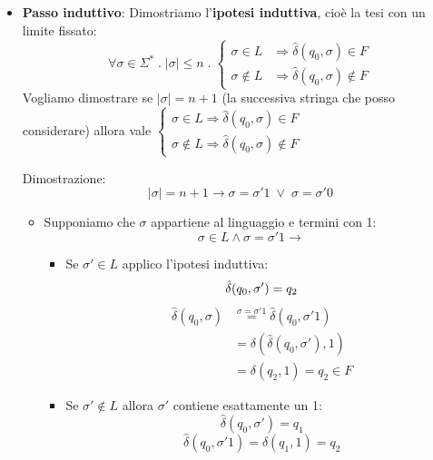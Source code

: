\documentclass[a4paper]{article}
\begin{document}
\begin{example}
\begin{itemize}
    \item \textbf{Passo induttivo}: Dimostriamo l'\textbf{ipotesi induttiva}, cioè
      la tesi con un limite fissato:
      \[
        \forall \sigma \in \Sigma^* \;.\; \left| \sigma  \right| \le n \;.\;
        \begin{cases}
          \sigma \in L &\Rightarrow \hat{\delta}(q_0, \sigma) \in F\\
          \sigma \notin L &\Rightarrow \hat{\delta}(q_0, \sigma) \notin F
        \end{cases}
      \] 
      Vogliamo dimostrare se \( \left| \sigma  \right| = n + 1 \) (la successiva stringa
      che posso considerare) allora vale
      \( 
        \begin{cases}
          \sigma \in L \Rightarrow \hat{\delta}(q_0,\sigma) \in F\\
          \sigma \notin L \Rightarrow \hat{\delta}(q_0,\sigma) \notin F
        \end{cases}
      \) 

      \vspace{1em}
      \noindent
      Dimostrazione:
      \[
        \left| \sigma  \right| = n + 1 \to 
          \sigma = \sigma'1 \; \vee \; \sigma = \sigma'0
      \] 
      \begin{itemize}
        \item Supponiamo che \( \sigma  \) appartiene al linguaggio e termini con 1:
          \[
            \sigma \in L \wedge \sigma  = \sigma'1 \to 
          \] 
          \begin{itemize}
            \item Se \( \sigma' \in L \) applico l'ipotesi induttiva:
              \[
                  \hat{\delta}(q_0, \sigma') = q_2\\
              \] 
              \[
                \begin{aligned}
                  \hat{\delta}(q_0, \sigma) &\stackrel{\sigma = \sigma'1}{=}
                  \hat{\delta}(q_0, \sigma'1)\\
                                            &= \delta(\hat{\delta}(q_0, \sigma'), 1)\\
                                            &= \delta(q_2, 1) = q_2 \in F
                \end{aligned}
              \] 

            \item Se \( \sigma' \notin L \) allora \( \sigma' \) contiene esattamente un 1:
              \[
                \hat{\delta}(q_0, \sigma') = q_1
              \] 
              \[
                \hat{\delta}(q_0, \sigma'1) = \delta(q_1, 1) = q_2
              \] 
          \end{itemize}


\end{itemize}
\end{itemize}
\end{example}
\end{document}
